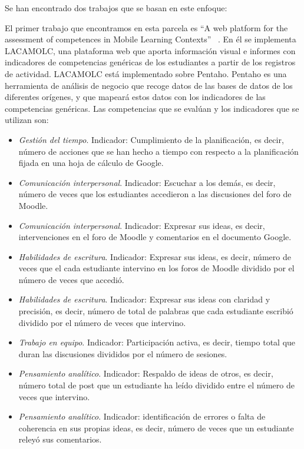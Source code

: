 Se han encontrado dos trabajos que se basan en este enfoque:

\bigskip
El primer trabajo que encontramos en esta parcela es “A web platform for the assessment of competences in Mobile Learning Contexts” ~\cite{rayon2014web}. En él se implementa LACAMOLC, una plataforma web que aporta información visual e informes con indicadores de competencias genéricas de los estudiantes a partir de los registros de actividad. LACAMOLC está implementado sobre Pentaho. Pentaho es una herramienta de análisis de negocio que recoge datos de las bases de datos de los diferentes orígenes, y que mapeará estos datos con los indicadores de las competencias genéricas. Las competencias que se evalúan y los indicadores que se utilizan son:

\begin{itemize}
\item \emph{Gestión del tiempo}. Indicador: Cumplimiento de la planificación, es decir, número de acciones que se han hecho a tiempo con respecto a la planificación fijada en una hoja de cálculo de Google.
\item \emph{Comunicación interpersonal}. Indicador: Escuchar a los demás, es decir, número de veces que los estudiantes accedieron a las discusiones del foro de Moodle.
\item \emph{Comunicación interpersonal}. Indicador: Expresar sus ideas, es decir, intervenciones en el foro de Moodle y comentarios en el documento Google.
\item \emph{Habilidades de escritura}. Indicador: Expresar sus ideas, es decir, número de veces que el cada estudiante intervino en los foros de Moodle dividido por el número de veces que accedió.
\item \emph{Habilidades de escritura}. Indicador: Expresar sus ideas con claridad y precisión, es decir, número de total de palabras que cada estudiante escribió dividido por el número de veces que intervino.
\item \emph{Trabajo en equipo}. Indicador: Participación activa, es decir, tiempo total que duran las discusiones divididos por el número de sesiones.
\item \emph{Pensamiento analítico}. Indicador: Respaldo de ideas de otros, es decir, número total de post que un estudiante ha leído dividido entre el número de veces que intervino.
\item \emph{Pensamiento analítico}. Indicador: identificación de errores o falta de coherencia en sus propias ideas, es decir, número de veces que un estudiante releyó sus comentarios.
\end{itemize}

